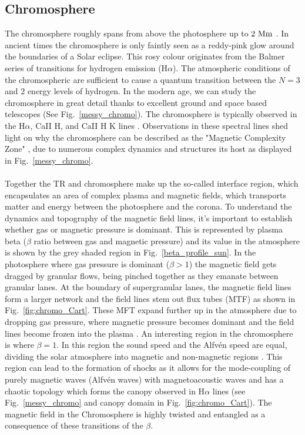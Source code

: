 \documentclass[12pt]{ociamthesis}
\newcommand{\Alfven}{Alfv\'{e}n }
\newcommand{\np}{\\ \\}
\begin{document}
\subsection{Chromosphere}
\label{ssec:Chromosphere}
The chromosphere roughly spans from above the photosphere up to $2~\rm{Mm}$ \citep{Lang_2006ses}. In ancient times the chromosphere is only faintly seen as a reddy-pink glow around the boundaries of a Solar eclipse. This rosy colour originates from the Balmer series of transitions for hydrogen emission (H$\alpha$). The atmospheric conditions of the chromospheric are sufficient to cause a quantum transition between the $N=3$ and $2$ energy levels of hydrogen. In the modern age, we can study the chromosphere in great detail thanks to excellent ground and space based telescopes (See Fig.~\ref{messy_chromo}). The chromosphere is typically observed in the H$\alpha$, CaII H, and CaII H K lines \citep{Ayres2019sgspbook27A}. Observations in these spectral lines shed light on why the chromosphere can be described as the "Magnetic Complexity Zone" \citep{Ayres2009astro2010S9A}, due to numerous complex dynamics and structures its host as displayed in Fig.~\ref{messy_chromo}. \np  
%
Together the TR and chromosphere make up the so-called interface region, which encapsulates an area of complex plasma and magnetic fields, which transports matter and energy between the photosphere and the corona. To understand the dynamics and topography of the magnetic field lines, it's important to establish whether gas or magnetic pressure is dominant. This is represented by plasma beta ($\beta$ ratio between gas and magnetic pressure) and its value in the atmosphere is shown by the grey shaded region in Fig.~\ref{beta_profile_sun}. In the photosphere where gas pressure is dominant ($\beta>1$) the magnetic field gets dragged by granular flows, being pinched together as they emanate between granular lanes. At the boundary of supergranular lanes, the magnetic field lines form a larger network and the field lines stem out flux tubes (MTF) as shown in Fig.~\ref{fig:chromo_Cart}. These MFT expand further up in the atmosphere due to dropping gas pressure, where magnetic pressure becomes dominant and the field lines become frozen into the plasma \citep{Ayres2009astro2010S9A}. An interesting region in the chromosphere is where $\beta=1$. In this region the sound speed and the \Alfven speed are equal, dividing the solar atmosphere into magnetic and non-magnetic regions \citep{Tsiropoula2012}. This region can lead to the formation of shocks as it allows for the mode-coupling of purely magnetic waves (\Alfven waves) with magnetoacoustic waves \citep{Hollweg1982SoPh7535H, Rosenthal2002ApJ564508R,Bogdan2003ApJ599626B, Cally2008SoPh251251C, Wang2020ApJ891110W} and has a chaotic topology which forms the canopy observed in H$\alpha$ lines (see Fig.~\ref{messy_chromo} and canopy domain in Fig.~\ref{fig:chromo_Cart}). The magnetic field in the Chromosphere is highly twisted and entangled as a consequence of these transitions of the $\beta$. \np
\end{document}
